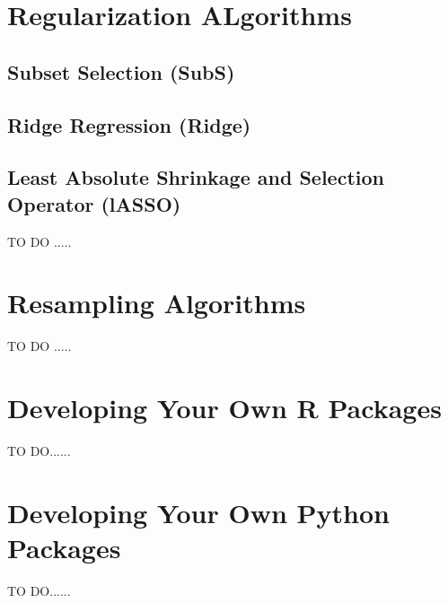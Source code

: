 \documentclass[letterpaper,11pt,english]{sphinxmanual}
\begin{document}
\chapter{Regularization ALgorithms}
\label{reg:regularization-algorithms}\label{reg::doc}\label{reg:reg}

\section{Subset Selection (SubS)}
\label{reg:subset-selection-subs}

\section{Ridge Regression (Ridge)}
\label{reg:ridge-regression-ridge}

\section{Least Absolute Shrinkage and Selection Operator (lASSO)}
\label{reg:least-absolute-shrinkage-and-selection-operator-lasso}
TO DO .....


\chapter{Resampling Algorithms}
\label{resample:resample}\label{resample::doc}\label{resample:resampling-algorithms}
TO DO .....


\chapter{Developing Your Own R Packages}
\label{rpkg:rpkg}\label{rpkg::doc}\label{rpkg:developing-your-own-r-packages}
TO DO......


\chapter{Developing Your Own Python Packages}
\label{ppkg:developing-your-own-python-packages}\label{ppkg:ppkg}\label{ppkg::doc}
TO DO......



\renewcommand{\indexname}{Index}
\printindex
\end{document}
